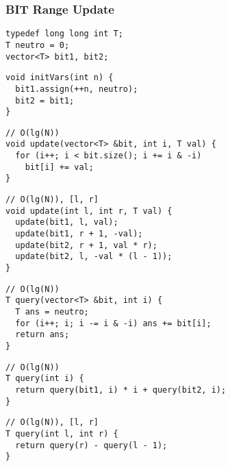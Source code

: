 \documentclass[twoside]{article}
\begin{document}
\begin{multicols*}{2}
\subsubsection*{BIT Range Update}
\begin{verbatim}
typedef long long int T;
T neutro = 0;
vector<T> bit1, bit2;
\end{verbatim}
\vspace{-12pt}
\begin{verbatim}
void initVars(int n) {
  bit1.assign(++n, neutro);
  bit2 = bit1;
}
\end{verbatim}
\vspace{-12pt}
\begin{verbatim}
// O(lg(N))
void update(vector<T> &bit, int i, T val) {
  for (i++; i < bit.size(); i += i & -i)
    bit[i] += val;
}
\end{verbatim}
\vspace{-12pt}
\begin{verbatim}
// O(lg(N)), [l, r]
void update(int l, int r, T val) {
  update(bit1, l, val);
  update(bit1, r + 1, -val);
  update(bit2, r + 1, val * r);
  update(bit2, l, -val * (l - 1));
}
\end{verbatim}
\vspace{-12pt}
\begin{verbatim}
// O(lg(N))
T query(vector<T> &bit, int i) {
  T ans = neutro;
  for (i++; i; i -= i & -i) ans += bit[i];
  return ans;
}
\end{verbatim}
\vspace{-12pt}
\begin{verbatim}
// O(lg(N))
T query(int i) {
  return query(bit1, i) * i + query(bit2, i);
}
\end{verbatim}
\vspace{-12pt}
\begin{verbatim}
// O(lg(N)), [l, r]
T query(int l, int r) {
  return query(r) - query(l - 1);
}
\end{verbatim}

\subsubsectionfont{\large\bfseries\sffamily\underline}

\end{multicols*}
\end{document}
